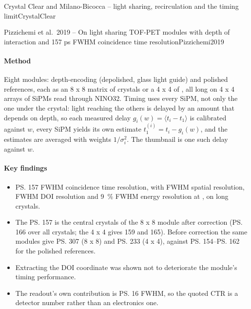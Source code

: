 \begin{programnote}{Crystal Clear and Milano-Bicocca -- light sharing, recirculation and the timing limit}{CrystalClear}
\begin{papernote}{Pizzichemi et al.\ 2019 -- On light sharing TOF-PET modules with depth of interaction and 157 ps FWHM coincidence time resolution}{Pizzichemi2019}
\paragraph{Method}
Eight modules: depth-encoding (depolished, glass light guide) and polished
references, each as an 8 x 8 matrix of  crystals or a 4 x 4 of
, all  long on 4 x 4 arrays of  SiPMs read through
NINO32. Timing uses every SiPM, not only the one under the crystal: light
reaching the others is delayed by an amount that depends on depth, so each
measured delay $g_i(w) = \langle t_i - t_1 \rangle$ is calibrated against $w$,
every SiPM yields its own estimate $t_1^{(i)} = t_i - g_i(w)$, and the
estimates are averaged with weights $1/\sigma_i^2$. The thumbnail is one such
delay against $w$.

\paragraph{Key findings}
\begin{itemize}
	\item \ps{157} FWHM coincidence time resolution, with  FWHM spatial
		resolution,  FWHM DOI resolution and \qty{9}{\percent} FWHM energy
		resolution at , on  long crystals.
	\item The \ps{157} is the central crystals of the 8 x 8 module after
		correction (\ps{166} over all crystals; the 4 x 4 gives 159 and 165).
		Before correction the same modules give \ps{307} (8 x 8) and \ps{233}
		(4 x 4), against \ps{154}--\ps{162} for the polished references.
	\item Extracting the DOI coordinate was shown not to deteriorate the
		module's timing performance.
	\item The readout's own contribution is \ps{16} FWHM, so the quoted CTR is
		a detector number rather than an electronics one.
\end{itemize}


\end{papernote}
\end{programnote}
